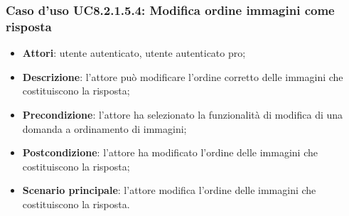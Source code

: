 \subsubsection{Caso d'uso UC8.2.1.5.4: Modifica ordine immagini come risposta}
\begin{itemize}
	\item\textbf{Attori}: utente autenticato, utente autenticato pro;
	\item\textbf{Descrizione}: l'attore può modificare l'ordine corretto delle immagini che costituiscono la risposta;
	\item\textbf{Precondizione}: l'attore ha selezionato la funzionalità di modifica di una domanda a ordinamento di immagini;
	\item \textbf{Postcondizione}: l'attore ha modificato l'ordine delle immagini che costituiscono la risposta;
	\item\textbf{Scenario principale}: l'attore modifica l'ordine delle immagini che costituiscono la risposta.
\end{itemize}

